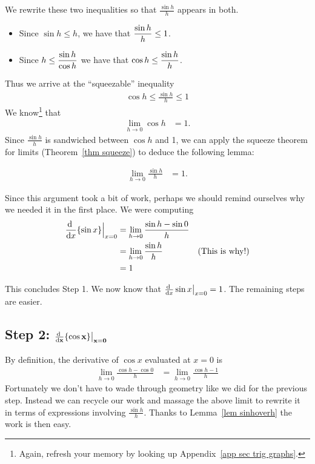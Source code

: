 We rewrite these two inequalities so that $\frac{\sin h}{h}$ appears in
both.
\begin{itemize}
 \item Since $\sin h \leq h$, we have that $\displaystyle \frac{\sin h}{h} \leq 1$.
\item Since $\displaystyle h \leq \frac{\sin h}{\cos h}$ we have that $\displaystyle \cos h \leq
\frac{\sin h}{h}$.
\end{itemize}
Thus we arrive at the ``squeezable'' inequality
\begin{align*}
  \cos h \leq \frac{\sin h}{h} \leq 1
\end{align*}
We know\footnote{Again, refresh your memory by looking up Appendix~\ref{app sec
trig graphs}.} that
\begin{align*}
  \lim_{h \to 0} \cos h &=1.
\end{align*}
Since $\tfrac{\sin h}{h}$ is sandwiched between $\cos h$ and 1, we can apply the
squeeze theorem for limits (Theorem~\ref{thm squeeze}) to deduce the following lemma:
\begin{lemma}
\label{lem sinhoverh}
\begin{align*}
  \lim_{h \to 0} \frac{\sin h}{h} &= 1.
\end{align*}
\end{lemma}


Since this argument took a bit of work, perhaps we should remind ourselves why
we needed it in the first place. We were computing
\begin{align*}
  \diff{}{x} \{ \sin x\}\Big|_{x=0}
  &= \lim_{h \to 0} \frac{\sin h - \sin 0}{h}  \\
  &= \lim_{h \to 0} \frac{\sin h}{h} & \text{(This is why!)}\\
  &= 1
\end{align*}


\noindent This concludes Step 1. We now know that
$\diff{}{x}\sin x\big|_{x=0}=1$. The remaining steps are easier.

\goodbreak
\subsection*{Step 2: $\mathbf{\diff{}{x} \{ \cos x \} \big|_{x=0}}$}

By definition, the derivative of $\cos x$ evaluated at $x=0$ is
\begin{align*}
\lim_{h\rightarrow 0}\frac{\cos h-\cos 0}{h}
&=\lim_{h\rightarrow 0}\frac{\cos h - 1}{h}
\end{align*}
Fortunately we don't have to wade through geometry like we did for the previous step.
Instead we can recycle our work and massage the above limit to rewrite it in terms of
expressions involving $\frac{\sin h}{h}$. Thanks to Lemma~\ref{lem sinhoverh} the work
is then easy.


